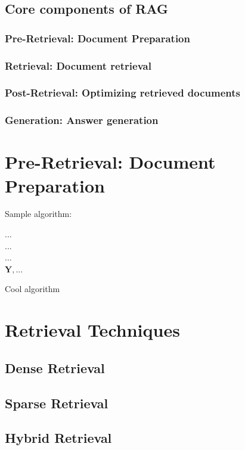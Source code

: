 \subsection{Core components of RAG}
\lipsum[2]

\subsubsection{Pre-Retrieval: Document Preparation}
\subsubsection{Retrieval: Document retrieval}
\subsubsection{Post-Retrieval: Optimizing retrieved documents}
\subsubsection{Generation: Answer generation}

\section{Pre-Retrieval: Document Preparation}

Sample algorithm:

\vspace{0.25cm}
\begin{algorithm}[H]
	...
	 \\
	...\\
	... \\
	\Return $\mathbf{Y}, ...$
	\caption{Cool algorithm \cite{goodfellow2016deep}}
	\label{alg:cool_algorithm}
\end{algorithm}
\vspace{0.25cm}

\section{Retrieval Techniques}
\subsection{Dense Retrieval}
\subsection{Sparse Retrieval}
\subsection{Hybrid Retrieval}
